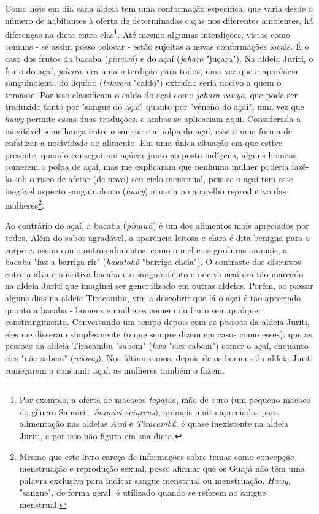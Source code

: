 Como hoje em dia cada aldeia tem uma conformação específica, que varia
desde o número de habitantes à oferta de determinadas caças nos
diferentes ambientes, há diferenças na dieta entre elas\footnote{Por
  exemplo, a oferta de macacos \emph{tapajua}, mão-de-ouro (um pequeno
  macaco do gênero Saimiri - \emph{Saimiri sciureus}), animais muito
  apreciados para alimentação nas aldeias \emph{Awá} e \emph{Tiracambú},
  é quase inexistente na aldeia Juriti, e por isso não figura em sua
  dieta.}. Até mesmo algumas interdições, vistas como comuns - se assim
posso colocar - estão sujeitas a novas conformações locais. É o caso dos
frutos da bacaba (\emph{pinawã}) e do açaí (\emph{jahara} "juçara"). Na
aldeia Juriti, o fruto do açaí, \emph{jahara}, era uma interdição para
todos, uma vez que a aparência sanguinolenta do líquido (\emph{tekwera}
"caldo") extraído seria nocivo a quem o tomasse. Por isso classificam o
caldo do açaí como \emph{jahara rawya}, que pode ser traduzido tanto por
"sangue do açaí" quanto por "veneno do açaí", uma vez que \emph{hawy}
permite essas duas traduções, e ambas se aplicariam aqui. Considerada a
inevitável semelhança entre o sangue e a polpa do açaí, essa é uma forma
de enfatizar a nocividade do alimento. Em uma única situação em que
estive presente, quando conseguiram açúcar junto ao posto indígena,
alguns homens comerem a polpa de açaí, mas me explicaram que nenhuma
mulher poderia fazê-lo sob o risco de afetar (de novo) seu ciclo
menstrual, pois se o açaí tem esse inegável aspecto sanguinolento
(\emph{hawy}) atuaria no aparelho reprodutivo das mulheres\footnote{Mesmo
  que este livro careça de informações sobre temas como concepção,
  menstruação e reprodução sexual, posso afirmar que os Guajá não têm
  uma palavra exclusiva para indicar sangue menstrual ou menstruação.
  \emph{Hawy}, "sangue", de forma geral, é utilizado quando se referem
  ao sangue menstrual.}.

Ao contrário do açaí, a bacaba (\emph{pinawã}) é um dos alimentos mais
apreciados por todos. Além do sabor agradável, a aparência leitosa e
clara é dita benigna para o corpo e, assim como outros alimentos, como o
mel e as gorduras animais, a bacaba "faz a barriga rir" (\emph{hakatohõ}
"barriga cheia"). O contraste dos discursos entre a alva e nutritiva
bacaba e o sanguinolento e nocivo açaí era tão marcado na aldeia Juriti
que imaginei ser generalizado em outras aldeias. Porém, ao passar alguns
dias na aldeia Tiracambu, vim a descobrir que lá o açaí é tão apreciado
quanto a bacaba - homens e mulheres comem do fruto sem qualquer
constrangimento. Conversando um tempo depois com as pessoas da aldeia
Juriti, eles me disseram simplesmente (o que sempre dizem em casos como
esses): que as pessoas da aldeia Tiracambu "sabem" (\emph{kwa} "eles
sabem") comer o açaí, enquanto eles "não sabem" (\emph{nikwaj}). Nos
últimos anos, depois de os homens da aldeia Juriti começarem a consumir
açaí, as mulheres também o fazem.

